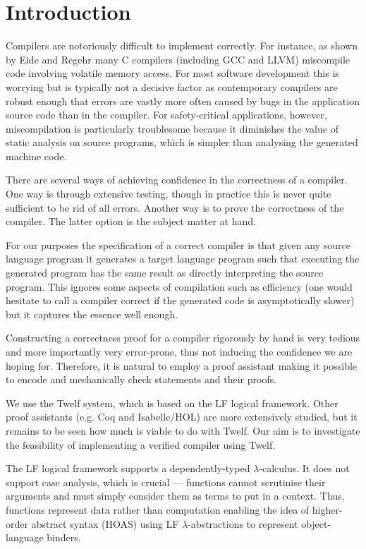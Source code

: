 \section{Introduction}

Compilers are notoriously difficult to implement correctly.
For instance, as shown by Eide and Regehr \cite{EideRegehr08} many C compilers (including GCC and LLVM) miscompile code involving volatile memory access.
For most software development this is worrying but is typically not a decisive factor as contemporary compilers are robust enough that errors are vastly more often caused by bugs in the application source code than in the compiler.
For safety-critical applications, however, miscompilation is particularly troublesome because it diminishes the value of static analysis on source programs, which is simpler than analysing the generated machine code.

There are several ways of achieving confidence in the correctness of a compiler.
One way is through extensive testing, though in practice this is never quite sufficient to be rid of all errors.
Another way is to prove the correctness of the compiler.
The latter option is the subject matter at hand.

For our purposes the specification of a correct compiler is that given any source language program it generates a target language program such that executing the generated program has the same result as directly interpreting the source program.
This ignores some aspects of compilation such as efficiency (one would hesitate to call a compiler correct if the generated code is asymptotically slower) but it captures the essence well enough.

Constructing a correctness proof for a compiler rigorously by hand is very tedious and more importantly very error-prone, thus not inducing the confidence we are hoping for.
Therefore, it is natural to employ a proof assistant making it possible to encode and mechanically check statements and their proofs.

We use the Twelf system, which is based on the LF logical framework.
Other proof assistants (e.g. Coq and Isabelle/HOL) are more extensively studied, but it remains to be seen how much is viable to do with Twelf.
Our aim is to investigate the feasibility of implementing a verified compiler using Twelf.

The LF logical framework \cite{Pfenning01} supports a dependently-typed $\lambda$-calculus.
It does not support case analysis, which is crucial --- functions cannot scrutinise their arguments and must simply consider them as terms to put in a context.
Thus, functions represent data rather than computation enabling the idea of higher-order abstract syntax (HOAS) using LF $\lambda$-abstractions to represent object-language binders.

